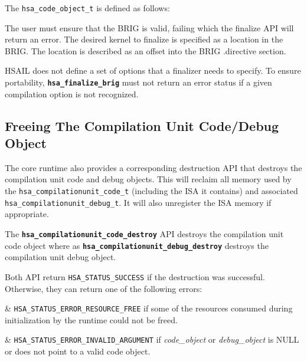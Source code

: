 \documentclass{book}
\newcommand{\diffblock}[1]{#1}
\newcommand{\ttbf}[1]{\diffblock{\texttt{\textbf{#1}}}}
\begin{document}
\begin{appendices}
The \texttt{hsa\_code\_object\_t} is defined as follows:




The user must ensure that the B\-R\-I\-G is valid, failing which the
finalize API will return an error.  The desired kernel to finalize
is specified as a location in the B\-R\-I\-G. The location is
described as an offset into the B\-R\-I\-G .directive section.

H\-S\-A\-I\-L does not define a set of options that a finalizer
needs to specify. To ensure portability, \ttbf{hsa\_finalize\_brig}
must not return an error status if a given compilation option is not
recognized.

\subsection{Freeing The Compilation Unit Code/Debug Object}

The core runtime also provides a corresponding destruction API that
destroys the compilation unit code and debug objects.  This will
reclaim all memory used by the
\texttt{hsa\_compilationunit\_code\_t} (including the ISA it
contains) and associated \texttt{hsa\_compilationunit\_debug\_t}. It
will also unregister the ISA memory if appropriate.



The \ttbf{hsa\_compilationunit\_code\_destroy} API destroys the
compilation unit code object where as
\ttbf{hsa\_compilationunit\_debug\_destroy} destroys the compilation
unit debug object.

Both API return \texttt{HSA\_STATUS\_SUCCESS} if the destruction was
successful. Otherwise, they can return one of the following errors:

\begin{easylist}

& \texttt{HSA\_STATUS\_ERROR\_RESOURCE\_FREE} if some of the
resources consumed during initialization by the runtime could not be
freed.

& \texttt{HSA\_STATUS\_ERROR\_INVALID\_ARGUMENT} if {\itshape
code\_object} or {\itshape debug\_object} is NULL or does not point
to a valid code object.


\end{easylist}
\end{appendices}
\end{document}
